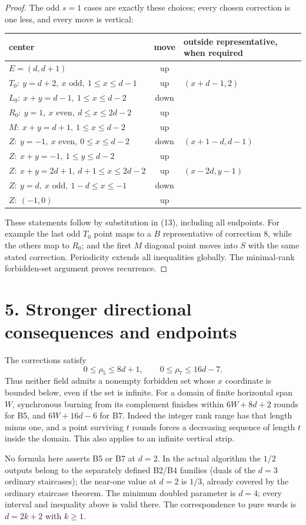\documentclass[11pt]{article}
\begin{document}
\begin{proof}
The odd $s=1$ cases are exactly these choices; every chosen correction
is one less, and every move is vertical:
\begin{center}\small
\begin{longtable}{lcl}
center&move&outside representative, when required\\\hline
$E=(d,d+1)$&up&\\
$T_0:\ y=d+2,\ x\text{ odd},\ 1\le x\le d-1$&up&$(x+d-1,2)$\\
$L_0:\ x+y=d-1,\ 1\le x\le d-2$&down&\\
$R_0:\ y=1,\ x\text{ even},\ d\le x\le2d-2$&up&\\
$M:\ x+y=d+1,\ 1\le x\le d-2$&up&\\
$Z:\ y=-1,\ x\text{ even},\ 0\le x\le d-2$&down&$(x+1-d,d-1)$\\
$Z:\ x+y=-1,\ 1\le y\le d-2$&up&\\
$Z:\ x+y=2d+1,\ d+1\le x\le2d-2$&up&$(x-2d,y-1)$\\
$Z:\ y=d,\ x\text{ odd},\ 1-d\le x\le-1$&down&\\
$Z:\ (-1,0)$&up&
\end{longtable}\end{center}
These statements follow by substitution in (13), including all endpoints.
For example the last odd $T_0$ point maps to a $B$ representative of
correction $8$, while the others map to $R_0$; and the first $M$
diagonal point moves into $S$ with the same stated correction.
Periodicity extends all inequalities globally. The minimal-rank
forbidden-set argument proves recurrence.
\end{proof}

\section*{5. Stronger directional consequences and endpoints}
The corrections satisfy
\[
 0\le\rho_5\le8d+1,\qquad 0\le\rho_7\le16d-7.
\]
Thus neither field admits a nonempty forbidden set whose $x$ coordinate
is bounded below, even if the set is infinite. For a domain of finite
horizontal span $W$, synchronous burning from its complement finishes
within $6W+8d+2$ rounds for B5, and $6W+16d-6$ for B7. Indeed the
integer rank range has that length minus one, and a point surviving
$t$ rounds forces a decreasing sequence of length $t$ inside the domain.
This also applies to an infinite vertical strip.

No formula here asserts B5 or B7 at $d=2$. In the actual algorithm the
$1/2$ outputs belong to the separately defined B2/B4 families (duals of
the $d=3$ ordinary staircases); the near-one value at $d=2$ is $1/3$,
already covered by the ordinary staircase theorem. The minimum doubled
parameter is $d=4$; every interval and inequality above is valid there.
The correspondence to pure words is $d=2k+2$ with $k\ge1$.
\end{document}
